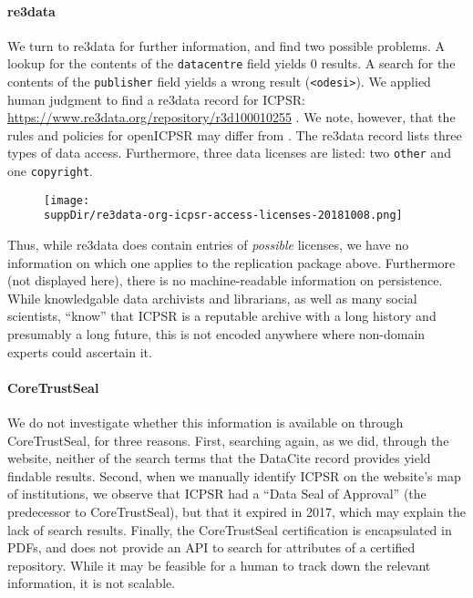 \paragraph{re3data}
We turn to re3data for further information, and find two possible problems. A lookup for the contents of the \texttt{datacentre} field yields 0 results. A search for the contents of the \texttt{publisher} field yields a wrong result (\lstinline|<odesi>|). We applied human judgment to find a re3data record for ICPSR: \url{https://www.re3data.org/repository/r3d100010255} \parencite{Re3data-icpsr}. We note, however, that the rules and policies for openICPSR may differ from .
The re3data record lists three types of data access. Furthermore, three data licenses are listed: two \texttt{other} and one \texttt{copyright}.
\begin{figure}[H]
	\texttt{[image: \\suppDir/re3data-org-icpsr-access-licenses-20181008.png]}
\end{figure}
Thus, while re3data does contain entries of \textit{possible} licenses, we have no information on which one applies to the replication package above. Furthermore (not displayed here), there is no machine-readable information on persistence. While knowledgable data archivists and librarians, as well as many social scientists, ``know'' that ICPSR is a reputable archive with a long history and presumably a long future, this is not encoded anywhere where non-domain experts could ascertain it.

\paragraph{CoreTrustSeal}
We do not investigate whether this information is available on through CoreTrustSeal, for three reasons. First, searching again, as we did, through the website, neither of the search terms that the DataCite record provides yield findable results. Second, when we manually identify ICPSR on the website's map of institutions, we observe that ICPSR had a ``Data Seal of Approval'' (the predecessor to CoreTrustSeal), but that it expired in 2017, which may explain the lack of search results. Finally, the CoreTrustSeal certification is encapsulated in PDFs, and does not provide an API to search for attributes of a certified repository. While it may be feasible for a human to track down the relevant information, it is not scalable.


